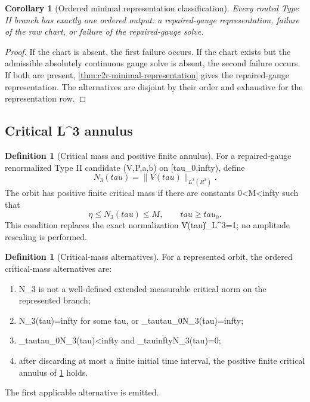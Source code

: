 \documentclass[11pt]{amsart}
\def\({}%
\def\){}%
\def\mathbb#1{#1}%
\def\tau{tau}%
\def\infty{infty}%
\theoremstyle{plain}
\newtheorem{corollary}[theorem]{Corollary}
\theoremstyle{definition}
\newtheorem{definition}[theorem]{Definition}
\theoremstyle{remark}
\begin{document}
\begin{corollary}[Ordered minimal representation classification]
\label{cor:c2r-ordered-classification}
Every routed Type II branch has exactly one ordered output: a repaired-gauge
representation, failure of the raw chart, or failure of the repaired-gauge
solve.
\end{corollary}

\begin{proof}
If the chart is absent, the first failure occurs.  If the chart exists but the
admissible absolutely continuous gauge solve is absent, the second failure
occurs.  If both are present, \cref{thm:c2r-minimal-representation} gives the
repaired-gauge representation.  The alternatives are disjoint by their order
and exhaustive for the representation row.
\end{proof}

\subsection{\texorpdfstring{Critical \(L^3\) annulus}{Critical L3 annulus}}

\begin{definition}[Critical mass and positive finite annulus]
\label{def:c3-critical-mass}
For a repaired-gauge renormalized Type II candidate \((V,P,a,b)\) on
\([\tau_0,\infty)\), define
\[
  N_3(\tau)=\|V(\tau)\|_{L^3(\mathbb R^3)}.
\]
The orbit has positive finite critical mass if there are constants
\(0<\eta\le M<\infty\) such that
\[
  \eta\le N_3(\tau)\le M,\qquad \tau\ge\tau_0.
\]
This condition replaces the exact normalization
\(\|V(\tau)\|_{L^3}=1\); no amplitude rescaling is performed.
\end{definition}

\begin{definition}[Critical-mass alternatives]
\label{def:c3-critical-mass-alternatives}
For a represented orbit, the ordered critical-mass alternatives are:
\begin{enumerate}[label=\textup{(\roman*)}]
\item \(N_3\) is not a well-defined extended measurable critical norm on the
represented branch;
\item \(N_3(\tau)=\infty\) for some \(\tau\), or
\(\sup_{\tau\ge\tau_0}N_3(\tau)=\infty\);
\item \(\sup_{\tau\ge\tau_0}N_3(\tau)<\infty\) and
\(\liminf_{\tau\to\infty}N_3(\tau)=0\);
\item after discarding at most a finite initial time interval, the positive
finite critical annulus of \cref{def:c3-critical-mass} holds.
\end{enumerate}
The first applicable alternative is emitted.
\end{definition}
\end{document}
